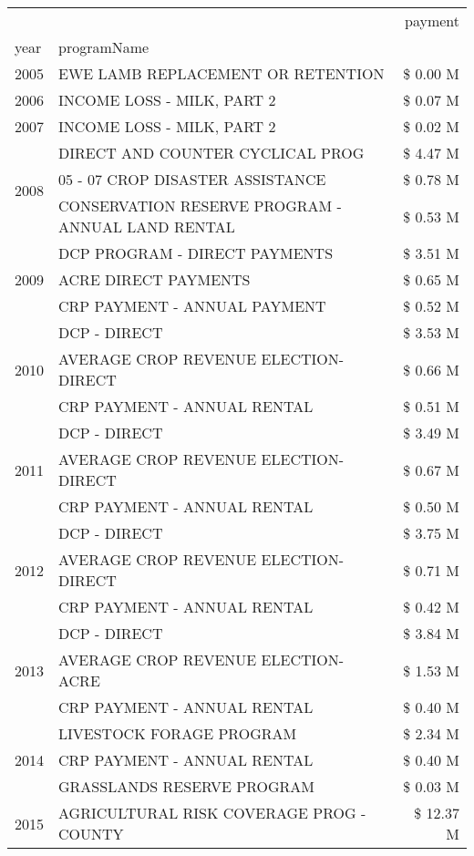 \begin{tabular}{llr}
\toprule
 &  & payment \\
year & programName &  \\
\midrule
2005 & EWE LAMB REPLACEMENT OR RETENTION & \$ 0.00 M \\
\cline{1-3}
2006 & INCOME LOSS - MILK, PART 2 & \$ 0.07 M \\
\cline{1-3}
2007 & INCOME LOSS - MILK, PART 2 & \$ 0.02 M \\
\cline{1-3}
\multirow[t]{3}{*}{2008} & DIRECT AND COUNTER CYCLICAL PROG & \$ 4.47 M \\
 & 05 - 07 CROP DISASTER ASSISTANCE & \$ 0.78 M \\
 & CONSERVATION RESERVE PROGRAM - ANNUAL LAND RENTAL & \$ 0.53 M \\
\cline{1-3}
\multirow[t]{3}{*}{2009} & DCP PROGRAM - DIRECT PAYMENTS & \$ 3.51 M \\
 & ACRE DIRECT PAYMENTS & \$ 0.65 M \\
 & CRP PAYMENT - ANNUAL PAYMENT & \$ 0.52 M \\
\cline{1-3}
\multirow[t]{3}{*}{2010} & DCP - DIRECT & \$ 3.53 M \\
 & AVERAGE CROP REVENUE ELECTION-DIRECT & \$ 0.66 M \\
 & CRP PAYMENT - ANNUAL RENTAL & \$ 0.51 M \\
\cline{1-3}
\multirow[t]{3}{*}{2011} & DCP - DIRECT & \$ 3.49 M \\
 & AVERAGE CROP REVENUE ELECTION-DIRECT & \$ 0.67 M \\
 & CRP PAYMENT - ANNUAL RENTAL & \$ 0.50 M \\
\cline{1-3}
\multirow[t]{3}{*}{2012} & DCP - DIRECT & \$ 3.75 M \\
 & AVERAGE CROP REVENUE ELECTION-DIRECT & \$ 0.71 M \\
 & CRP PAYMENT - ANNUAL RENTAL & \$ 0.42 M \\
\cline{1-3}
\multirow[t]{3}{*}{2013} & DCP - DIRECT & \$ 3.84 M \\
 & AVERAGE CROP REVENUE ELECTION-ACRE & \$ 1.53 M \\
 & CRP PAYMENT - ANNUAL RENTAL & \$ 0.40 M \\
\cline{1-3}
\multirow[t]{3}{*}{2014} & LIVESTOCK FORAGE PROGRAM & \$ 2.34 M \\
 & CRP PAYMENT - ANNUAL RENTAL & \$ 0.40 M \\
 & GRASSLANDS RESERVE PROGRAM & \$ 0.03 M \\
\cline{1-3}
\multirow[t]{3}{*}{2015} & AGRICULTURAL RISK COVERAGE PROG - COUNTY & \$ 12.37 M \\

\end{tabular}
